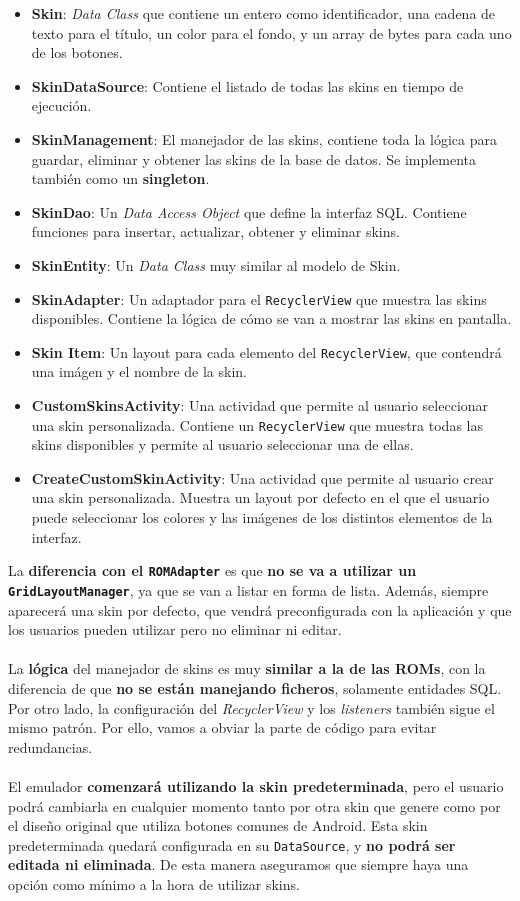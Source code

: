 \begin{itemize}
    \item \textbf{Skin}: \textit{Data Class} que contiene un entero como identificador, una cadena de texto para el título, un color para el fondo, y un array de bytes para cada uno de los botones.
    \item \textbf{SkinDataSource}: Contiene el listado de todas las skins en tiempo de ejecución.
    \item \textbf{SkinManagement}: El manejador de las skins, contiene toda la lógica para guardar, eliminar y obtener las skins de la base de datos. Se implementa también como un \textbf{singleton}.
    \item \textbf{SkinDao}: Un \textit{Data Access Object} que define la interfaz SQL. Contiene funciones para insertar, actualizar, obtener y eliminar skins.
    \item \textbf{SkinEntity}: Un \textit{Data Class} muy similar al modelo de Skin.
    \item \textbf{SkinAdapter}: Un adaptador para el \texttt{RecyclerView} que muestra las skins disponibles. Contiene la lógica de cómo se van a mostrar las skins en pantalla.
    \item \textbf{Skin Item}: Un layout para cada elemento del \texttt{RecyclerView}, que contendrá una imágen y el nombre de la skin.
    \item \textbf{CustomSkinsActivity}: Una actividad que permite al usuario seleccionar una skin personalizada. Contiene un \texttt{RecyclerView} que muestra todas las skins disponibles y permite al usuario seleccionar una de ellas.
    \item \textbf{CreateCustomSkinActivity}: Una actividad que permite al usuario crear una skin personalizada. Muestra un layout por defecto en el que el usuario puede seleccionar los colores y las imágenes de los distintos elementos de la interfaz.
\end{itemize}

La \textbf{diferencia con el \texttt{ROMAdapter}} es que \textbf{no se va a utilizar un \texttt{GridLayoutManager}}, ya que se van a listar en forma de lista. Además, siempre aparecerá una skin por defecto, que vendrá preconfigurada con la aplicación y que los usuarios pueden utilizar pero no eliminar ni editar.
\\\\
La \textbf{lógica} del manejador de skins es muy \textbf{similar a la de las ROMs}, con la diferencia de que \textbf{no se están manejando ficheros}, solamente entidades SQL. Por otro lado, la configuración del \textit{RecyclerView} y los \textit{listeners} también sigue el mismo patrón. Por ello, vamos a obviar la parte de código para evitar redundancias.
\\\\
El emulador \textbf{comenzará utilizando la skin predeterminada}, pero el usuario podrá cambiarla en cualquier momento tanto por otra skin que genere como por el diseño original que utiliza botones comunes de Android. Esta skin predeterminada quedará configurada en su \texttt{DataSource}, y \textbf{no podrá ser editada ni eliminada}. De esta manera aseguramos que siempre haya una opción como mínimo a la hora de utilizar skins.

